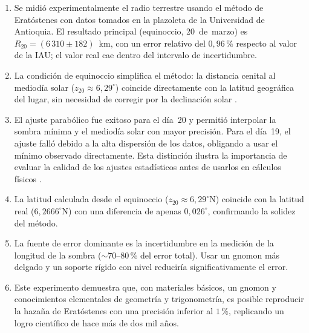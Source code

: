 \documentclass[12pt,a4paper]{article}
\begin{document}
\begin{enumerate}
  \item Se midió experimentalmente el radio terrestre usando el método
        de Eratóstenes con datos tomados en la plazoleta de la
        Universidad de Antioquia.
        El resultado principal (equinoccio, 20~de~marzo) es
        $R_{20} = (6\,310 \pm 182)$~km, con un error relativo del
        $0{,}96\,\%$ respecto al valor de la IAU; el valor real cae
        dentro del intervalo de incertidumbre.

  \item La condición de equinoccio simplifica el método: la distancia
        cenital al mediodía solar ($z_{20} \approx 6{,}29^\circ$) coincide
        directamente con la latitud geográfica del lugar, sin necesidad
        de corregir por la declinación solar \citep{PortillaBarbosa2009}.

  \item El ajuste parabólico fue exitoso para el día~20 y permitió
        interpolar la sombra mínima y el mediodía solar con mayor
        precisión.
        Para el día~19, el ajuste falló debido a la alta dispersión de
        los datos, obligando a usar el mínimo observado directamente.
        Esta distinción ilustra la importancia de evaluar la calidad
        de los ajustes estadísticos antes de usarlos en cálculos físicos
        \citep{Baird1991}.

  \item La latitud calculada desde el equinoccio
        ($z_{20} \approx 6{,}29^\circ$N) coincide con la latitud real
        ($6{,}2666^\circ$N) con una diferencia de apenas $0{,}026^\circ$,
        confirmando la solidez del método.

  \item La fuente de error dominante es la incertidumbre en la
        medición de la longitud de la sombra ($\sim 70$--$80\,\%$ del
        error total).
        Usar un gnomon más delgado y un soporte rígido con nivel
        reduciría significativamente el error.

  \item Este experimento demuestra que, con materiales básicos, un
        gnomon y conocimientos elementales de geometría y trigonometría,
        es posible reproducir la hazaña de Eratóstenes con una
        precisión inferior al $1\,\%$, replicando un logro científico
        de hace más de dos mil años.
\end{enumerate}


\end{document}
